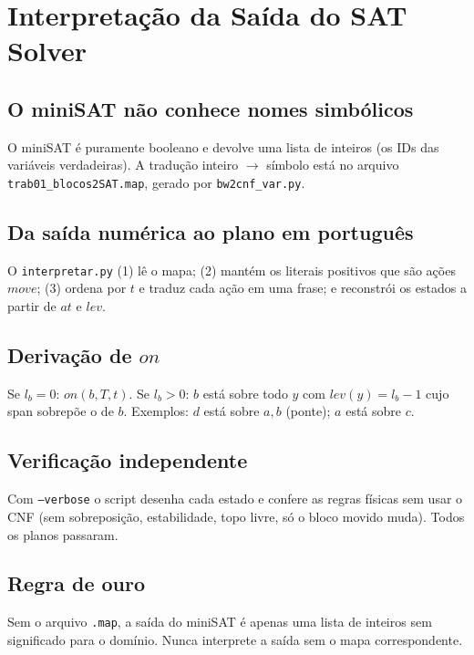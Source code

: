 \documentclass[11pt,a4paper]{article}
\newcommand{\at}{\mathit{at}}
\newcommand{\lev}{\mathit{lev}}
\newcommand{\on}{\mathit{on}}
\newcommand{\mv}{\mathit{move}}
\begin{document}
\section{Interpreta\c{c}\~ao da Sa\'ida do SAT Solver}
\subsection{O miniSAT n\~ao conhece nomes simb\'olicos}
O miniSAT \'e puramente booleano e devolve uma lista de inteiros (os IDs das vari\'aveis verdadeiras). A tradu\c{c}\~ao inteiro $\to$ s\'imbolo est\'a no arquivo \texttt{trab01\_blocos2SAT.map}, gerado por \texttt{bw2cnf\_var.py}.
\subsection{Da sa\'ida num\'erica ao plano em portugu\^es}
O \texttt{interpretar.py} (1) l\^e o mapa; (2) mant\'em os literais positivos que s\~ao a\c{c}\~oes $\mv$; (3) ordena por $t$ e traduz cada a\c{c}\~ao em uma frase; e reconstr\'oi os estados a partir de $\at$ e $\lev$.
\subsection{Deriva\c{c}\~ao de $\on$}
Se $l_b=0$: $\on(b,T,t)$. Se $l_b>0$: $b$ est\'a sobre todo $y$ com $\lev(y)=l_b-1$ cujo span sobrep\~oe o de $b$. Exemplos: $d$ est\'a sobre $a,b$ (ponte); $a$ est\'a sobre $c$.
\subsection{Verifica\c{c}\~ao independente}
Com \texttt{--verbose} o script desenha cada estado e confere as regras f\'isicas sem usar o CNF (sem sobreposi\c{c}\~ao, estabilidade, topo livre, s\'o o bloco movido muda). Todos os planos passaram.
\subsection{Regra de ouro}
Sem o arquivo \texttt{.map}, a sa\'ida do miniSAT \'e apenas uma lista de inteiros sem significado para o dom\'inio. Nunca interprete a sa\'ida sem o mapa correspondente.
\end{document}
